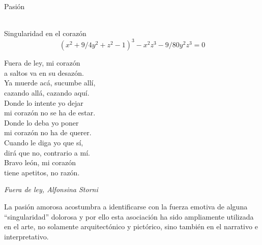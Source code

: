 \documentclass[es]{../../common/SurferDesc}%
\begin{document}
\footnotesize

\begin{surferPage}
  \begin{surferTitle}Pasi\'on\end{surferTitle}   \\
Singularidad en el coraz\'on\\
\smallskip
\[(x^2+ 9/4y^2	+ z^2- 1)^3- x^2z^3	- 9/80y^2z^3	= 0\]

\singlespacing
Fuera de ley, mi coraz\'on\\a saltos va en su desaz\'on.\\
\vspace{0.3cm}
Ya muerde ac\'a, sucumbe all\'i,\\cazando all\'a, cazando aqu\'i.\\
\vspace{0.3cm}
Donde lo intente yo dejar\\mi coraz\'on no se ha de estar.\\
\vspace{0.3cm}
Donde lo deba yo poner\\mi coraz\'on no ha de querer.\\
\vspace{0.3cm}
Cuando le diga yo que s\'i,\\dir\'a que no, contrario a m\'i.\\
\vspace{0.3cm}
Bravo le\'on, mi coraz\'on\\tiene apetitos, no raz\'on.

\begin{flushright}
{\it Fuera de ley, Alfonsina Storni}
\end{flushright}

\singlespacing 
La pasi\'on amorosa acostumbra a identificarse con la fuerza emotiva de alguna ``singularidad'' dolorosa y por ello esta asociaci\'on ha sido ampliamente utilizada en el arte, no solamente arquitect\'onico y pict\'orico, sino tambi\'en en el narrativo e interpretativo. 

  \begin{surferText}
     \end{surferText}
\end{surferPage}
\end{document}
